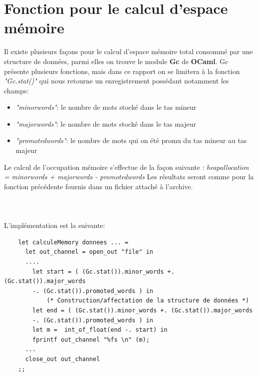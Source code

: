 \section{Fonction pour le calcul d'espace mémoire}
    Il existe plusieurs façons pour le calcul d’espace mémoire total consommé par une structure de données, parmi elles on trouve le module \textbf{Gc}\cite{refGc} de \textbf{OCaml}. Gc présente plusieurs fonctions, mais dans ce rapport on se limitera à la fonction \textit{"Gc.stat()"} qui nous retourne un enregistrement possédant notamment les champs: 
    \begin{itemize}
        \item \textit{"minor\textunderscore words"}: le nombre de mots stocké dans le tas mineur
        \item \textit{"major\textunderscore words"}: le nombre de mots stocké dans le tas majeur
        \item \textit{"promoted\textunderscore words"}: le nombre de mots qui on été promu du tas mineur au tas majeur
    \end{itemize}
    Le calcul de l'occupation mémoire s'effectue de la façon suivante :  \textit{heap\textunderscore allocation = minor\textunderscore words + major\textunderscore words - promoted\textunderscore words}
    Les résultats seront comme pour la fonction précédente fournis dans un fichier attaché à l'archive.
    \\ \\ \\
    \\L'implémentation est la suivante:
    \begin{verbatim} 
    let calculeMemory donnees ... = 
      let out_channel = open_out "file" in
      .... 
        let start = ( (Gc.stat()).minor_words +. (Gc.stat()).major_words 
        -. (Gc.stat()).promoted_words ) in
            (* Construction/affectation de la structure de données *)
        let end = ( (Gc.stat()).minor_words +. (Gc.stat()).major_words 
        -. (Gc.stat()).promoted_words ) in
        let m =  int_of_float(end -. start) in 
        fprintf out_channel "%fs \n" (m); 
      ...
      close_out out_channel
    ;;
    \end{verbatim} 


